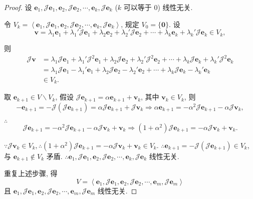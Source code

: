 \documentclass[color=black,device=normal,lang=cn,mode=geye]{elegantnote}
\begin{document}
\begin{proof}
    设 $\boldsymbol{e}_1,\mathcal{J}\boldsymbol{e}_1,\boldsymbol{e}_2,\mathcal{J}\boldsymbol{e}_2,\cdots,\boldsymbol{e}_k,\mathcal{J}\boldsymbol{e}_k$ ($k$ 可以等于 $0$) 线性无关.
    
    令 $V_k=\left<\boldsymbol{e}_1,\mathcal{J}\boldsymbol{e}_1,\boldsymbol{e}_2,\mathcal{J}\boldsymbol{e}_2,\cdots,\boldsymbol{e}_k,\mathcal{J}\boldsymbol{e}_k\right>$, 规定 $V_0=\{\boldsymbol{0}\}$. 设
    \[\boldsymbol{v}=\lambda_1\boldsymbol{e}_1+\lambda_1'\mathcal{J}\boldsymbol{e}_1+\lambda_2\boldsymbol{e}_2+\lambda_2'\mathcal{J}\boldsymbol{e}_2+\cdots+\lambda_k\boldsymbol{e}_k+\lambda_k'\mathcal{J}\boldsymbol{e}_k\in V_k,\]

    则
    \begin{align*}
        \mathcal{J}\boldsymbol{v} & =\lambda_1\mathcal{J}\boldsymbol{e}_1+\lambda_1'\mathcal{J}^2\boldsymbol{e}_1+\lambda_2\mathcal{J}\boldsymbol{e}_2+\lambda_2'\mathcal{J}^2\boldsymbol{e}_2+\cdots+\lambda_k\mathcal{J}\boldsymbol{e}_k+\lambda_k'\mathcal{J}^2\boldsymbol{e}_k \\
        & =\lambda_1\mathcal{J}\boldsymbol{e}_1-\lambda_1'\boldsymbol{e}_1+\lambda_2\mathcal{J}\boldsymbol{e}_2-\lambda_2'\boldsymbol{e}_2+\cdots+\lambda_k\mathcal{J}\boldsymbol{e}_k-\lambda_k'\boldsymbol{e}_k \\
        & \in V_k.
    \end{align*}

    取 $\boldsymbol{e}_{k+1}\in V\backslash V_k$, 假设 $\mathcal{J}\boldsymbol{e}_{k+1}=\alpha\boldsymbol{e}_{k+1}+\boldsymbol{v}_k$, 其中 $\boldsymbol{v}_k\in V_k$, 则
    \[-\boldsymbol{e}_{k+1}=-\mathcal{J}(\mathcal{J}\boldsymbol{e}_{k+1})=\alpha\mathcal{J}\boldsymbol{e}_{k+1}+\mathcal{J}\boldsymbol{v}_k\Rightarrow\alpha\boldsymbol{e}_{k+1}=-\alpha^2\mathcal{J}\boldsymbol{e}_{k+1}-\alpha\mathcal{J}\boldsymbol{v}_k,\]
    
    $\therefore$
    \[\mathcal{J}\boldsymbol{e}_{k+1}=-\alpha^2\mathcal{J}\boldsymbol{e}_{k+1}-\alpha\mathcal{J}\boldsymbol{v}_k+\boldsymbol{v}_k\Rightarrow(1+\alpha^2)\mathcal{J}\boldsymbol{e}_{k+1}=-\alpha\mathcal{J}\boldsymbol{v}_k+\boldsymbol{v}_k.\]

    $\because\mathcal{J}\boldsymbol{v}_k\in V_k,\therefore(1+\alpha^2)\mathcal{J}\boldsymbol{e}_{k+1}=-\alpha\mathcal{J}\boldsymbol{v}_k+\boldsymbol{v}_k\in V_k$. $\therefore\boldsymbol{e}_{k+1}=-\mathcal{J}(\mathcal{J}\boldsymbol{e}_{k+1})\in V_k$, 与 $\boldsymbol{e}_{k+1}\notin V_k$ 矛盾. $\therefore\boldsymbol{e}_1,\mathcal{J}\boldsymbol{e}_1,\boldsymbol{e}_2,\mathcal{J}\boldsymbol{e}_2,\cdots,\boldsymbol{e}_k,\mathcal{J}\boldsymbol{e}_k$ 线性无关.

    重复上述步骤, 得
    \[V=\left<\boldsymbol{e}_1,\mathcal{J}\boldsymbol{e}_1,\boldsymbol{e}_2,\mathcal{J}\boldsymbol{e}_2,\cdots,\boldsymbol{e}_m,\mathcal{J}\boldsymbol{e}_m\right>\]
    且 $\boldsymbol{e}_1,\mathcal{J}\boldsymbol{e}_1,\boldsymbol{e}_2,\mathcal{J}\boldsymbol{e}_2,\cdots,\boldsymbol{e}_m,\mathcal{J}\boldsymbol{e}_m$ 线性无关.
\end{proof}
\end{document}
